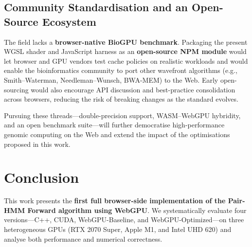 \documentclass[12pt]{report}
\begin{document}
\section{Community Standardisation and an Open-Source Ecosystem}
The field lacks a \textbf{browser-native BioGPU benchmark}. Packaging the present WGSL shader and JavaScript harness as an \textbf{open-source NPM module} would let browser and GPU vendors test cache policies on realistic workloads and would enable the bioinformatics community to port other wavefront algorithms (e.g., Smith–Waterman, Needleman–Wunsch, BWA-MEM) to the Web. Early open-sourcing would also encourage API discussion and best-practice consolidation across browsers, reducing the risk of breaking changes as the standard evolves.

Pursuing these threads—double-precision support, WASM–WebGPU hybridity, and an open benchmark suite—will further democratise high-performance genomic computing on the Web and extend the impact of the optimisations proposed in this work.

\chapter{Conclusion}
This work presents the \textbf{first full browser-side implementation of the Pair-HMM Forward algorithm using WebGPU}. We systematically evaluate four versions—C++, CUDA, WebGPU-Baseline, and WebGPU-Optimized—on three heterogeneous GPUs (RTX 2070 Super, Apple M1, and Intel UHD 620) and analyse both performance and numerical correctness.
\end{document}
